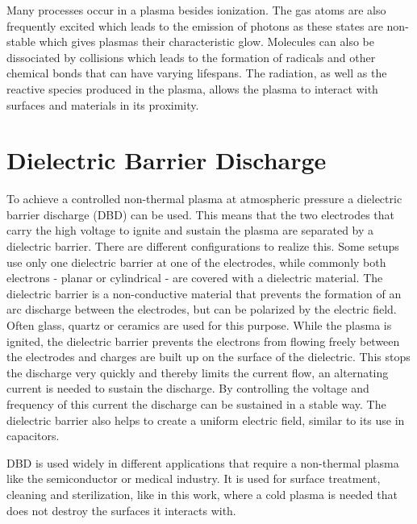 Many processes occur in a plasma besides ionization. The gas atoms are also frequently excited which leads to the emission of photons as these states are non-stable which gives plasmas their characteristic glow. Molecules can also be dissociated by collisions which leads to the formation of radicals and other chemical bonds that can have varying lifespans. The radiation, as well as the reactive species produced in the plasma, allows the plasma to interact with surfaces and materials in its proximity.

\section{Dielectric Barrier Discharge}
To achieve a controlled non-thermal plasma at atmospheric pressure a dielectric barrier discharge (DBD) can be used. This means that the two electrodes that carry the high voltage to ignite and sustain the plasma are separated by a dielectric barrier. There are different configurations to realize this. Some setups use only one dielectric barrier at one of the electrodes, while commonly both electrons - planar or cylindrical - are covered with a dielectric material. The dielectric barrier is a non-conductive material that prevents the formation of an arc discharge between the electrodes, but can be polarized by the electric field. Often glass, quartz or ceramics are used for this purpose. While the plasma is ignited, the dielectric barrier prevents the electrons from flowing freely between the electrodes and charges are built up on the surface of the dielectric. This stops the discharge very quickly and thereby limits the current flow, an alternating current is needed to sustain the discharge. By controlling the voltage and frequency of this current the discharge can be sustained in a stable way. The dielectric barrier also helps to create a uniform electric field, similar to its use in capacitors. 

DBD is used widely in different applications that require a non-thermal plasma like the semiconductor or medical industry. It is used for surface treatment, cleaning and sterilization, like in this work, where a cold plasma is needed that does not destroy the surfaces it interacts with.

